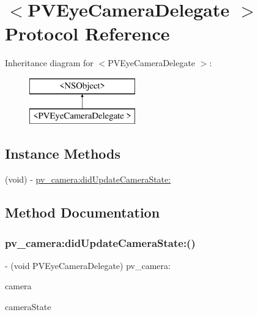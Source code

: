 \hypertarget{protocol_p_v_eye_camera_delegate_01-p}{}\section{$<$P\+V\+Eye\+Camera\+Delegate $>$ Protocol Reference}
\label{protocol_p_v_eye_camera_delegate_01-p}
Inheritance diagram for $<$P\+V\+Eye\+Camera\+Delegate $>$\+:\begin{figure}[H]
\begin{center}
\leavevmode
\includegraphics[height=2.000000cm]{protocol_p_v_eye_camera_delegate_01-p}
\end{center}
\end{figure}
\subsection*{Instance Methods}
\begin{DoxyCompactItemize}
\item 
(void) -\/ \hyperlink{protocol_p_v_eye_camera_delegate_01-p_ac7c6a74bf7617a6dfb39bb6b58f65782}{pv\+\_\+camera\+:did\+Update\+Camera\+State\+:}
\end{DoxyCompactItemize}


\subsection{Method Documentation}
\mbox{\label{protocol_p_v_eye_camera_delegate_01-p_ac7c6a74bf7617a6dfb39bb6b58f65782}} 
\subsubsection{\texorpdfstring{pv\+\_\+camera\+:did\+Update\+Camera\+State\+:()}{pv\_camera:didUpdateCameraState:()}}
{\footnotesize\ttfamily -\/ (void P\+V\+Eye\+Camera\+Delegate) pv\+\_\+camera\+: \begin{DoxyParamCaption}\item[{(\hyperlink{interface_p_v_eye_camera}{P\+V\+Eye\+Camera} $\ast$\+\_\+\+Nullable)}]{camera }\item[{didUpdateCameraState:(P\+V\+Eye\+Camera\+State)}]{camera\+State }\end{DoxyParamCaption}}

